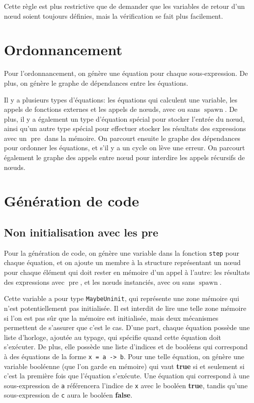 \documentclass{scrartcl}
\DeclareMathOperator{\mspawn}{spawn}
\DeclareMathOperator{\mpre}{pre}
\newcommand{\keyword}[1]{{\textcolor{green!50!black}{\textbf{#1}}}}
\newcommand{\pre}{\keyword{pre}}
\newcommand{\true}{\keyword{true}}
\newcommand{\false}{\keyword{false}}
\begin{document}
Cette règle est plus restrictive que de demander que les variables de retour d'un n\oe{}ud soient
toujours définies, mais la vérification se fait plus facilement.

\section{Ordonnancement}
Pour l'ordonnancement, on génère une équation pour chaque sous-expression.
De plus, on génère le graphe de dépendances entre les équations.

Il y a plusieurs types d'équations: les équations qui calculent une variable, les appels de
fonctions externes et les appels de n\oe{}uds, avec ou sans \(\mspawn\). De plus, il y a
également un type d'équation spécial pour stocker l'entrée du n\oe{}ud, ainsi qu'un autre type
spécial pour effectuer stocker les résultats des expressions avec un \(\mpre\) dans la
mémoire. On parcourt ensuite le graphe des dépendances pour ordonner les équations, et s'il y a
un cycle on lève une erreur. On parcourt également le graphe des appels entre n\oe{}ud pour
interdire les appels récursifs de n\oe{}uds.

\section{Génération de code}

\subsection{Non initialisation avec les \pre}
Pour la génération de code, on génère une variable dans la fonction \texttt{step} pour chaque
équation, et on ajoute un membre à la structure représentant un n\oe{}ud pour chaque élément qui
doit rester en mémoire d'un appel à l'autre: les résultats des expressions avec \(\mpre\), et
les n\oe{}uds instanciés, avec ou sans \(\mspawn\).

Cette variable a pour type \texttt{MaybeUninit}, qui représente une zone mémoire qui n'est
potentiellement pas initialisée. Il est interdit de lire une telle zone mémoire si l'on est pas
sûr que la mémoire est initialisée, mais deux mécanismes permettent de s'assurer que c'est le
cas. D'une part, chaque équation possède une liste d'horloge, ajoutée au typage, qui spécifie
quand cette équation doit s'exécuter. De plus, elle possède une liste d'indices et de booléens
qui correspond à des équations de la forme \texttt{x = a -> b}. Pour une telle équation, on
génère une variable booléenne (que l'on garde en mémoire) qui vaut \true{} si et seulement
si c'est la première fois que l'équation s'exécute.  Une équation qui correspond à une
sous-expression de \texttt{a} référencera l'indice de \texttt{x} avec le booléen \true,
tandis qu'une sous-expression de \texttt{c} aura le booléen \false.
\end{document}
